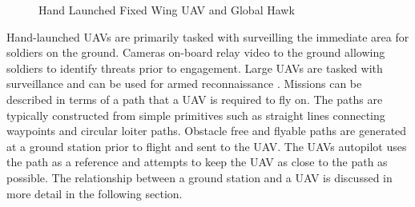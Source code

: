 \documentclass[numbered,pdftex]{ohio-etd}
\begin{document}
\begin{figure}[H]
	\begin{subfigmatrix}{2}%
		\centering
		\hspace*{0mm}
	\end{subfigmatrix}
	\caption{Hand Launched Fixed Wing UAV and Global Hawk}
	\label{fig:fixedwings}
\end{figure}

Hand-launched UAVs are primarily tasked with surveilling the immediate area for soldiers on the ground. Cameras on-board relay video to the ground allowing soldiers to identify threats prior to engagement. Large UAVs are tasked with surveillance and can be used for armed reconnaissance \cite{bone_uavs_2003}. Missions can be described in terms of a path that a UAV is required to fly on. The paths are typically constructed from simple primitives such as straight lines connecting waypoints and circular loiter paths. Obstacle free and flyable paths are generated at a ground station prior to flight and sent to the UAV. The UAVs autopilot uses the path as a reference and attempts to keep the UAV as close to the path as possible.  The relationship between a ground station and a UAV is discussed in more detail in the following section. 
\end{document}
